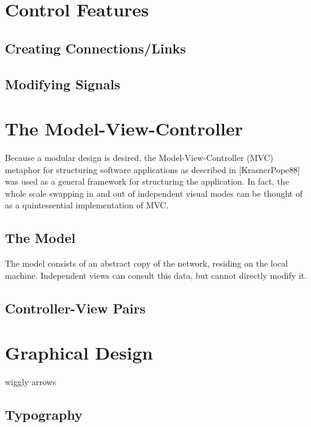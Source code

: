 \section{Control Features}
\subsection{Creating Connections/Links}
\subsection{Modifying Signals}

\section{The Model-View-Controller}

	Because a modular design is desired, the Model-View-Controller (MVC) metaphor for structuring software applications as described in [KrasnerPope88] was used as a general framework for structuring the application. In fact, the whole scale swapping in and out of independent visual modes can be thought of as a quintessential implementation of MVC. 
	
\subsection{The Model}

	The model consists of an abstract copy of the network, residing on the local machine. Independent views can consult this data, but cannot directly modify it.

\subsection{Controller-View Pairs}

\section{Graphical Design}
	wiggly arrows
\subsection{Typography}


